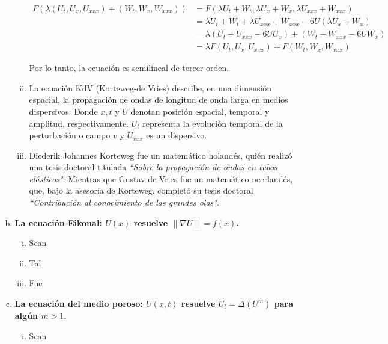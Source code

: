 \documentclass[fleqn]{article}
\begin{document}
\begin{enumerate}[(a)]
\begin{enumerate}[(i)]
			\begin{align*}
				F(\lambda (U_t, U_x, U_{xxx}) + (W_t, W_x, W_{xxx})) &= F(\lambda U_t + W_t, \lambda U_x + W_x, \lambda U_{xxx} + W_{xxx}) \\
				&= \lambda U_t + W_t + \lambda U_{xxx} + W_{xxx} - 6U(\lambda U_x + W_x) \\
				&= \lambda (U_t + U_{xxx} - 6UU_x) + (W_t + W_{xxx} - 6UW_x) \\
				&= \lambda F(U_t, U_x, U_{xxx}) + F(W_t, W_x, W_{xxx})
			\end{align*}

			Por lo tanto, la ecuación es semilineal de tercer orden.
			
			\item La ecuación KdV (Korteweg-de Vries) describe, en una dimensión espacial, la propagación de ondas de longitud de onda larga en medios dispersivos. Donde $ x, t $ y $ U $ denotan posición espacial, temporal y amplitud, respectivamente. $ U_t $ representa la evolución temporal de la perturbación o campo $ v $ y $ U_{xxx} $ es un dispersivo.
			
			\item Diederik Johannes Korteweg fue un matemático holandés, quién realizó una tesis doctoral titulada \textit{``Sobre la propagación de ondas en tubos elásticos"}. Mientras que Gustav de Vries fue un matemático neerlandés, que, bajo la asesoría de Korteweg, completó su tesis doctoral \textit{``Contribución al conocimiento de las grandes olas"}.
		\end{enumerate}

		\item \textbf{La ecuación Eikonal: $ U(x) $ resuelve $ \lVert \nabla U \rVert = f(x) $.}
		
		\begin{enumerate}[(i)]
			\item Sean 
			
			\item Tal
			
			\item Fue
		\end{enumerate}

		\item \textbf{La ecuación del medio poroso: $ U(x,t) $ resuelve $ U_t = \Delta (U^m) $ para algún $ m > 1 $.}
		
		\begin{enumerate}[(i)]
			\item Sean 
			

\end{enumerate}
\end{enumerate}
\end{document}
